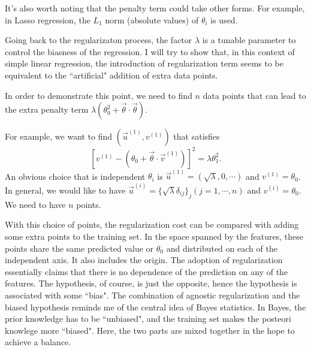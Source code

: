 It's also worth noting that the penalty term could take other forms. For example, in Lasso regression, the $L_1$ norm (absolute values) of $\theta_i$ is used.

Going back to the regularizaton process, the factor $\lambda$ is a tunable parameter to control the biasness of the regression. I will try to show that, in this
context of simple linear regression, the introduction of regularization term seems to be equivalent to the ``artificial" addition of extra data points.

In order to demonstrate this point, we need to find $n$ data points that can lead to the extra penalty term $\lambda(\theta_0^2+\vec\theta\cdot\vec\theta)$.

For example, we want to find $(\vec u^{(1)}, v^{(1)})$ that satisfies 
\begin{equation}
\left[v^{(1)} - \left(\theta_0 + \vec\theta\cdot\vec v^{(1)}\right)\right]^2 = \lambda\theta_1^2.
\end{equation}
An obvious choice that is independent $\theta_i$ is $\vec u^{(1)} = (\sqrt\lambda, 0, \cdots)$ and $v^{(1)} = \theta_0$.
In general, we would like to have $\vec u^{(i)} = \{\sqrt\lambda\delta_{ij}\}_j (j=1, \cdots, n)$ and $v^{(i)} = \theta_0$\footnotemark{}. We need to have $n$ points. 

With this choice of points, the regularization cost can be compared with adding some extra points to the training set. In the space spanned by 
the features, these points share the same predicted value or $\theta_0$ and distributed on each of the independent axis. It also includes the origin. The adoption 
of regularization essentially claims that there is no dependence of the prediction on any of the features. The hypothesis, of course, is just the opposite, hence
the hypothesis is associated with some ``bias". The combination of agnostic regularization and the biased hypothesis reminds me of the central idea of
Bayes statistics. In Bayes, the prior knowledge has to be ``unbiased", and the training set makes the posteori knowlege more ``biased". Here, the
two parts are mixed together in the hope to achieve a balance.

